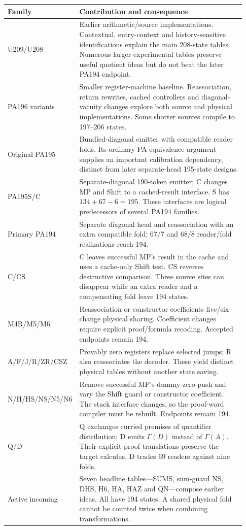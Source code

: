 \documentclass[11pt,letterpaper]{article}
\begin{document}
\begin{longtable}{>{\raggedright\arraybackslash}p{0.20\linewidth}>{\raggedright\arraybackslash}p{0.73\linewidth}}
\toprule
Family & Contribution and consequence\\\midrule\endhead
U209/U208 & Earlier arithmetic/source implementations. Contextual,
entry-context and history-sensitive identifications explain the main
208-state tables. Numerous larger experimental tables preserve useful
quotient ideas but do not beat the later PA194 endpoint.\\
PA196 variants & Smaller register-machine baseline. Reassociation,
return rewrites, cached controllers and diagonal-vacuity changes explore
both source and physical implementations. Some shorter sources compile
to 197--206 states.\\
Original PA195 & Bundled-diagonal emitter with compatible reader folds.
Its ordinary PA-equivalence argument supplies an important calibration
dependency, distinct from later separate-head 195-state designs.\\
PA195S/C & Separate-diagonal 190-token emitter; C changes MP and Shift
to a cached-result interface. S has $134+67-6=195$. These interfaces
are logical predecessors of several PA194 families.\\
Primary PA194 & Separate diagonal head and reassociation with an extra
compatible fold; 67/7 and 68/8 reader/fold realizations reach 194.\\
C/CS & C leaves successful MP's result in the cache and uses a cache-only
Shift test. CS reverses destructive comparison. Three source sites can
disappear while an extra reader and a compensating fold leave 194 states.\\
M4R/M5/M6 & Reassociation or constructor coefficients five/six change
physical sharing. Coefficient changes require explicit proof/formula
recoding. Accepted endpoints remain 194.\\
A/F/J/R/ZR/CSZ & Provably zero registers replace selected jumps; R also
reassociates the decoder. These yield distinct physical tables without
another state saving.\\
N/H/HS/NS/N5/N6 & Remove successful MP's dummy-zero push and vary the
Shift guard or constructor coefficient. The stack interface changes, so
the proof-word compiler must be rebuilt. Endpoints remain 194.\\
Q/D & Q exchanges curried premises of quantifier distribution; D emits
$\Gamma(D)$ instead of $\Gamma(A)$. Their explicit proof translations
preserve the target calculus. D trades 69 readers against nine folds.\\
Active incoming & Seven headline tables---SUMS, sum-guard NS, DHS, H6,
HA, HAZ and QN---compose earlier ideas. All have 194 states. A shared
physical fold cannot be counted twice when combining transformations.\\
\bottomrule
\end{longtable}
\end{document}
